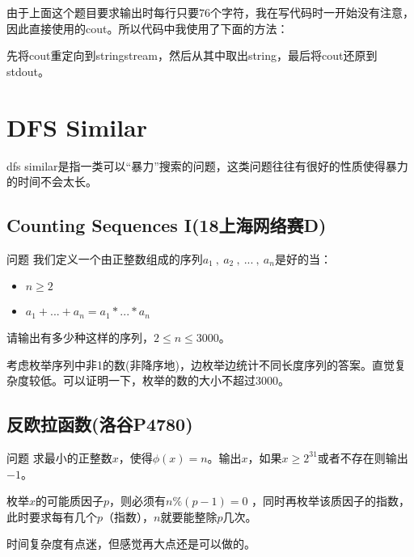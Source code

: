 

\begin{note}
	由于上面这个题目要求输出时每行只要$76$个字符，我在写代码时一开始没有注意，因此直接使用的cout。所以代码中我使用了下面的方法：
	
	
	先将cout重定向到stringstream，然后从其中取出string，最后将cout还原到stdout。
\end{note}

\section{DFS Similar}
dfs similar是指一类可以“暴力”搜索的问题，这类问题往往有很好的性质使得暴力的时间不会太长。

\subsection{Counting Sequences I(18上海网络赛D)}
\begin{custom}{问题}
我们定义一个由正整数组成的序列$a_1\ ,\ a_2\ ,\ ...\ ,\ a_n$是好的当：
\begin{itemize}
\item $n\ge2$
\item $a_1+...+a_n = a_1*...*a_n$
\end{itemize}
请输出有多少种这样的序列，$2\le n \le 3000$。
\end{custom}

\begin{solution}
考虑枚举序列中非1的数(非降序地)，边枚举边统计不同长度序列的答案。直觉复杂度较低。可以证明一下，枚举的数的大小不超过3000。
\end{solution}








\subsection{反欧拉函数(洛谷P4780)}
\begin{custom}{问题}
求最小的正整数$x$，使得$\phi(x)=n$。输出$x$，如果$x\ge 2^{31}$或者不存在则输出$-1$。
\end{custom}

\begin{solution}
枚举$x$的可能质因子$p$，则必须有$n\%(p-1)=0$ ，同时再枚举该质因子的指数，此时要求每有几个$p$（指数），$n$就要能整除$p$几次。  

时间复杂度有点迷，但感觉再大点还是可以做的。
\end{solution}







